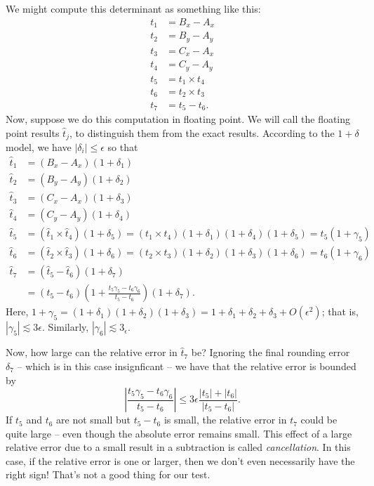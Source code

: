 \documentclass[12pt, leqno]{article}
\begin{document}
We might compute this determinant as something like this:
\begin{align*}
  t_1 &= B_x-A_x \\
  t_2 &= B_y-A_y \\
  t_3 &= C_x-A_x \\
  t_4 &= C_y-A_y \\
  t_5 &= t_1 \times t_4 \\
  t_6 &= t_2 \times t_3 \\
  t_7 &= t_5-t_6.
\end{align*}
Now, suppose we do this computation in floating point.  We will call
the floating point results $\hat{t}_j$, to distinguish them from the
exact results.  According to the $1+\delta$ model,
we have $|\delta_i| \leq \epsilon$ so that
\begin{align*}
  \hat{t}_1 &= (B_x-A_x)(1+\delta_1) \\
  \hat{t}_2 &= (B_y-A_y)(1+\delta_2) \\
  \hat{t}_3 &= (C_x-A_x)(1+\delta_3) \\
  \hat{t}_4 &= (C_y-A_y)(1+\delta_4) \\
  \hat{t}_5 &= (\hat{t}_1 \times \hat{t}_4)(1+\delta_5)
             = (t_1 \times t_4)(1+\delta_1)(1+\delta_4)(1+\delta_5)
             = t_5 (1+\gamma_5) \\
  \hat{t}_6 &= (\hat{t}_2 \times \hat{t}_3)(1+\delta_6)
             = (t_2 \times t_3)(1+\delta_2)(1+\delta_3)(1+\delta_6)
             = t_6 (1+\gamma_6) \\
  \hat{t}_7 &= (\hat{t}_5-\hat{t}_6)(1+\delta_7) \\
            &= (t_5-t_6)
               \left( 1 + \frac{t_5 \gamma_5 - t_6 \gamma_6}{t_5-t_6} \right)
               (1 + \delta_7).
\end{align*}
Here, $1 + \gamma_5 = (1+\delta_1)(1+\delta_2)(1+\delta_3)
= 1+\delta_1 + \delta_2 + \delta_3 + O(\epsilon^2)$; that is,
$|\gamma_5| \lesssim 3 \epsilon$.
Similarly, $|\gamma_6| \lesssim 3_{\epsilon}$.

Now, how large can the relative error in $\hat{t}_7$ be?  Ignoring the final
rounding error $\delta_7$ -- which is in this case insignficant -- we have
that the relative error is bounded by
\[
  \left| \frac{t_5 \gamma_5 - t_6 \gamma_6}{t_5-t_6} \right| \leq
  3 \epsilon \frac{|t_5| + |t_6|}{|t_5-t_6|}.
\]
If $t_5$ and $t_6$ are not small but $t_5-t_6$ is small, the relative error
in $t_7$ could be quite large -- even though the absolute error remains small.
This effect of a large relative error due to a small result in a subtraction
is called {\em cancellation}.  In this case,
if the relative error is one or larger, then we don't even necessarily
have the right sign!  That's not a good thing for our test.
\end{document}
